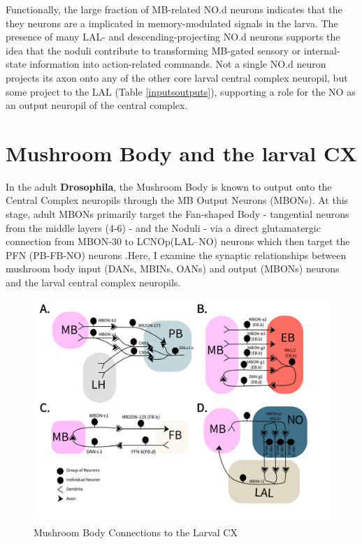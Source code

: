     Functionally, the large fraction of MB-related NO.d neurons indicates that the they neurons are a implicated in memory-modulated signals in the larva. The presence of many LAL- and descending-projecting NO.d neurons supports the idea that the noduli contribute to transforming MB-gated sensory or internal-state information into action-related commands.
    Not a single NO.d neuron projects its axon onto any of the other core larval central complex neuropil, but some project to the LAL (Table \ref{inputsoutputs}), supporting a role for the NO as an output neuropil of the central complex.

\section{Mushroom Body and the larval CX}
    \label{CXMB}
    In the adult \textbf{Drosophila}, the Mushroom Body is known to output onto the Central Complex neuropils through the MB Output Neurons (MBONs). At this stage, adult MBONs primarily target the Fan-shaped Body - tangential neurons from the middle layers (4-6) - and the Noduli - via a direct glutamatergic connection from MBON-30 to LCNOp(LAL–NO) neurons which then target the PFN (PB-FB-NO) neurons \citep{hulse2021connectome}.Here, I examine the synaptic relationships between mushroom body input (DANs, MBINs, OANs) and output (MBONs) neurons and the larval central complex neuropils. 
        
    \begin{figure}
        \centering
        \includegraphics[width=17cm]{Figs/CX/MBtoCX.pdf}
        \caption[Mushroom Body Connections to the Larval CX]{Mushroom Body Connections to the Larval CX}
        \label{MBtoCX}
    \end{figure}
    
